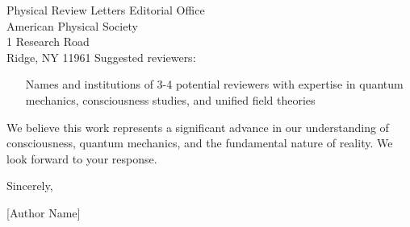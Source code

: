 \documentclass[12pt]{letter}
\begin{document}
\begin{letter}{Physical Review Letters Editorial Office\\
American Physical Society\\
1 Research Road\\
Ridge, NY 11961}
Suggested reviewers:
\begin{itemize}
\item [Names and institutions of 3-4 potential reviewers with expertise in quantum mechanics, consciousness studies, and unified field theories]
\end{itemize}

We believe this work represents a significant advance in our understanding of consciousness, quantum mechanics, and the fundamental nature of reality. We look forward to your response.

\closing{Sincerely,}

[Author Name]\\
[Institution]\\
[Contact Information]

\end{letter}
\end{document}
